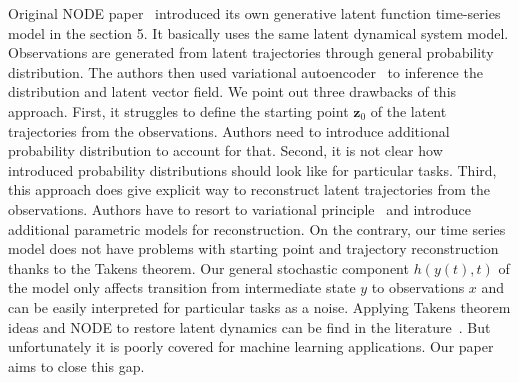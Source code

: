 \documentclass[referee, pdflatex, sn-mathphys-num]{sn-jnl}
\theoremstyle{definition}
\theoremstyle{plain}
\newcommand{\bz}{\ensuremath{\mathbf{z}}}
\begin{document}
		Original NODE paper~\cite{node} introduced its own generative latent function time-series model in the section 5. It basically uses the same latent dynamical system model. Observations are generated from latent trajectories through general probability distribution. The authors then used variational autoencoder~\cite{Kingma2013AutoEncodingVB} to inference the distribution and latent vector field. We point out three drawbacks of this approach. First, it struggles to define the starting point $\bz_0$ of the latent trajectories from the observations. Authors need to introduce additional probability distribution to account for that. Second, it is not clear how introduced probability distributions should look like for particular tasks. Third, this approach does give explicit way to reconstruct latent trajectories from the observations. Authors have to resort to variational principle~\cite{blei2017variational} and introduce additional parametric models for reconstruction. On the contrary, our time series model does not have problems with starting point and trajectory reconstruction thanks to the Takens theorem. Our general stochastic component $h(y(t), t)$ of the model only affects transition from intermediate state $y$ to observations $x$ and can be easily interpreted for particular tasks as a noise. Applying Takens theorem ideas and NODE to restore latent dynamics can be find in the literature~\cite{node_takens_1, node_takens_2}. But unfortunately it is poorly covered for machine learning applications. Our paper aims to close this gap.
		
		
		
		
		
		
		
		
		
	
 
\end{document}

